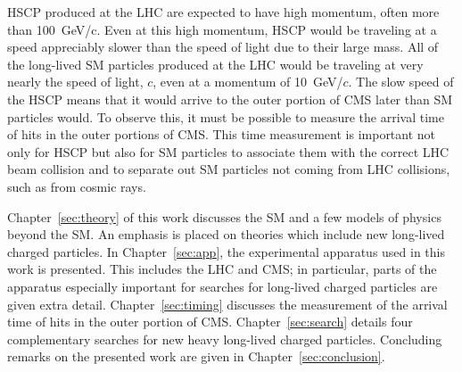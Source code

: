 HSCP produced at the LHC are expected to have high momentum, often more than 100~GeV/c. Even at this high momentum, HSCP would be traveling at a speed
appreciably slower than the speed of light due to their large mass. All of the long-lived SM particles produced at the LHC would be traveling at very nearly
the speed of light, $c$, even at a momentum of 10~GeV/$c$.
The slow speed of the HSCP means that it would arrive to the outer portion of CMS later than SM particles would.
To observe this, it must be possible to measure the arrival time of hits in the outer portions of CMS. This time measurement is important not only
for HSCP but also for SM particles to associate them with the correct LHC beam collision and to separate out SM particles not coming from
LHC collisions, such as from cosmic rays.

Chapter~\ref{sec:theory} of this work discusses the SM and a few models of physics beyond the SM. 
An emphasis is placed on theories which include new long-lived charged particles.
In Chapter~\ref{sec:app}, the experimental apparatus used in this work is presented. This includes the LHC and 
CMS; in particular, parts of the apparatus especially important
for searches for long-lived charged particles are given extra detail.
Chapter~\ref{sec:timing} discusses the measurement of the arrival time of hits in the outer portion of CMS.
Chapter~\ref{sec:search} details four complementary searches for new heavy long-lived charged particles.
Concluding remarks on the presented work are given in Chapter~\ref{sec:conclusion}.